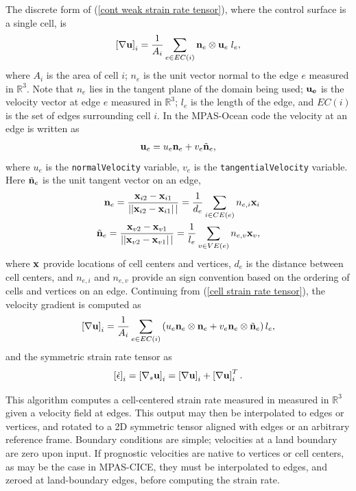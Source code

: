 \documentclass[11pt]{report}
\begin{document}
The discrete form of (\ref{cont weak strain rate tensor}), where the control surface is a single cell, is
\begin{equation}
\label{cell strain rate tensor}
\left[\nabla {\bf u} \right]_i
= 
\frac{1}{A_i} 
\sum_{e\in EC(i)}{
  {\bf n}_e\otimes{\bf u}_e \; l_e },
\end{equation}
where $A_i$ is the area of cell $i$; $n_e$ is the unit vector normal to the edge $e$ measured in $\mathbb{R}^3$. Note that $n_e$ lies in the  tangent plane of the domain being used; $\bf{u_e}$ is the velocity vector at edge $e$ measured in $\mathbb{R}^3$; $l_e$ is the length of the edge, and $EC(i)$ is the set of edges surrounding cell $i$.  In the MPAS-Ocean code the velocity at an edge is written as 
\begin{eqnarray}
{\bf u}_e = u_e {\bf n}_e + v_e \tilde{\bf n}_e,
\end{eqnarray}
where $u_e$ is the \verb|normalVelocity| variable, $v_e$ is the \verb|tangentialVelocity| variable.  Here $\tilde{\bf n}_e$ is the unit tangent vector on an edge,
\begin{eqnarray}
{\bf n}_e = \frac{{\bf x}_{i2}-{\bf x}_{i1}}{\left||{\bf x}_{i2}-{\bf x}_{i1}\right||}
  = \frac{1}{d_e} \sum_{i\in CE(e)}n_{e,i}{\bf x}_{i} 
\\
 \tilde{\bf n}_e = \frac{{\bf x}_{v2}-{\bf x}_{v1}}{\left||{\bf x}_{v2}-{\bf x}_{v1}\right||}
  = \frac{1}{l_e} \sum_{v\in VE(e)}n_{e,v}{\bf x}_{v},
\end{eqnarray}
where ${\bf x}$ provide locations of cell centers and vertices, $d_e$ is the distance between cell centers, and $n_{e,i}$ and $n_{e,v}$ provide an sign convention based on the ordering of cells and vertices on an edge.  Continuing from (\ref{cell strain rate tensor}), the velocity gradient is computed as
\begin{equation}
\label{cell strain rate tensor uv}
\left[\nabla {\bf u} \right]_i
= 
\frac{1}{A_i} 
\sum_{e\in EC(i)}{\left(
  u_e{\bf n}_e\otimes{\bf n}_e 
 +v_e{\bf n}_e\otimes\tilde{\bf n}_e 
\right)l_e },
\end{equation}
and the symmetric strain rate tensor as
\begin{equation}
\label{cell strain rate tensor sym}
\left[\dot\epsilon  \right]_i
= 
\left[\nabla_s {\bf u} \right]_i
= 
\left[\nabla {\bf u} \right]_i
+
\left[\nabla {\bf u} \right]^T_i.
\end{equation}

This algorithm computes a cell-centered strain rate measured in measured in $\mathbb{R}^3$ given a velocity field at edges.  This output may then be interpolated to edges or vertices, and rotated to a 2D symmetric tensor aligned with edges or an arbitrary reference frame.  Boundary conditions are simple; velocities at a land boundary are zero upon input.  If prognostic velocities are native to vertices or cell centers, as may be the case in MPAS-CICE, they must be interpolated to edges, and zeroed at land-boundary edges, before computing the strain rate.
\end{document}
